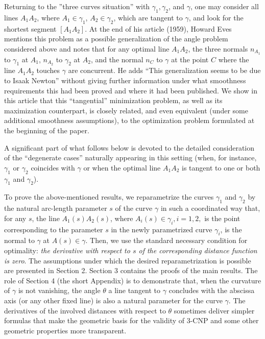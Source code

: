 \documentclass[a4paper,12pt]{amsart}
\def\g{\gamma}
\begin{document}
\medskip

Returning to the ''three curves situation'' with
$\g_1, \g_2$, and $ \g$, one may consider all lines $A_1A_2$, where $A_1 \in \g_1$, $A_2 \in \g_2$, which are tangent to $\g$, and look for the shortest segment $[A_1A_2]$.
At the end of his article \cite{EVES}(1959), Howard Eves mentions this problem as a possible generalization of the angle problem considered above and notes that for any optimal line $A_1A_2$, the three normals  $n_{A_1}$ to
$\g_1$ at $A_1$, $n_{A_2}$ to $\g_2$ at $A_2$, and the normal
$n_{C}$ to $\g$ at  the point $C$ where the line $A_1A_2$ touches $\g$ are concurrent. He adds ``This generalization seems to be due to Isaak Newton'' without giving further information under what smoothness requirements this had been proved and where it had been published. We show in this article that this ``tangential'' minimization problem, as well as its maximization counterpart, is closely related, and even equivalent (under some additional smoothness assumptions), to the optimization problem formulated at the beginning of the paper.


 \medskip

 A significant part of what follows below is devoted to the detailed consideration of the
 ``degenerate cases'' naturally appearing in this setting
(when, for instance, $\g_1$ or $\g_2$ coincides with $\g$ or when the optimal line $A_1A_2$ is tangent to one or both $\g_1$ and $\g_2$).

\medskip

To prove the above-mentioned results, we reparametrize the curves $\g_1$ and $\g_2$ by the
natural arc-length parameter $s$ of the curve $\g$
in such a coordinated way that, for any $s$,  the line $A_1(s)A_2(s)$, where $A_i(s) \in \g_i, i=1,2,$ is the point corresponding to the parameter $s$ in the newly parametrized curve $\g_i$, is the normal to $\g$ at $A(s) \in \g$. Then, we use the standard necessary condition for optimality: {\it the derivative with respect to $s$ of the corresponding distance function is zero}.
The assumptions under which the desired reparametrization is possible are presented in Section 2. Section 3 contains the proofs of the
main results. The role of Section 4 (the short Appendix) is to demonstrate that, when the curvature of
$\g$ is not vanishing, the angle $\theta$ a line tangent to $\g$ concludes with the abscissa axis (or any other fixed line) is also a natural parameter for the curve $\g$. The derivatives of the involved distances with respect to $\theta$ sometimes deliver simpler formulas that make the geometric basis for the validity of 3-CNP and some other geometric properties more transparent.
\end{document}
